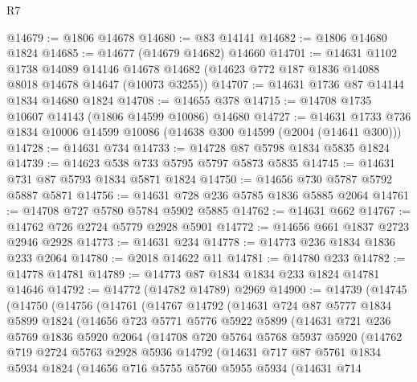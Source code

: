 \begin{lexlean}{R7}
\begin{coremodule}
@14679 := @1806 @14678
@14680 := @83 @14141
@14682 := @1806 @14680 @1824
@14685 := @14677 (@14679 @14682) @14660
@14701 := @14631
    @1102
    @1738
    @14089
    @14146
    @14678
    @14682
    (@14623 @772 @187 @1836 @14088 @8018 @14678 @14647 (@10073 @3255))
@14707 := @14631 @1736 @87 @14144 @1834 @14680 @1824
@14708 := @14655 @378
@14715 := @14708 @1735 @10607 @14143 (@1806 @14599 @10086) @14680
@14727 := @14631 @1733 @736 @1834 @10006 @14599 @10086 (@14638 @300 @14599 (@2004 (@14641 @300)))
@14728 := @14631 @734
@14733 := @14728 @87 @5798 @1834 @5835 @1824
@14739 := @14623 @538 @733 @5795 @5797 @5873 @5835
@14745 := @14631 @731 @87 @5793 @1834 @5871 @1824
@14750 := @14656 @730 @5787 @5792 @5887 @5871
@14756 := @14631 @728 @236 @5785 @1836 @5885 @2064
@14761 := @14708 @727 @5780 @5784 @5902 @5885
@14762 := @14631 @662
@14767 := @14762 @726 @2724 @5779 @2928 @5901
@14772 := @14656 @661 @1837 @2723 @2946 @2928
@14773 := @14631 @234
@14778 := @14773 @236 @1834 @1836 @233 @2064
@14780 := @2018 @14622 @11
@14781 := @14780 @233
@14782 := @14778 @14781
@14789 := @14773 @87 @1834 @1834 @233 @1824 @14781 @14646
@14792 := @14772 (@14782 @14789) @2969
@14900 := @14739
    (@14745
      (@14750
        (@14756
          (@14761
            (@14767
              @14792
              (@14631
                @724
                @87
                @5777
                @1834
                @5899
                @1824
                (@14656
                  @723
                  @5771
                  @5776
                  @5922
                  @5899
                  (@14631
                    @721
                    @236
                    @5769
                    @1836
                    @5920
                    @2064
                    (@14708
                      @720
                      @5764
                      @5768
                      @5937
                      @5920
                      (@14762
                        @719
                        @2724
                        @5763
                        @2928
                        @5936
                        @14792
                        (@14631
                          @717
                          @87
                          @5761
                          @1834
                          @5934
                          @1824
                          (@14656
                            @716
                            @5755
                            @5760
                            @5955
                            @5934
                            (@14631
                              @714

\end{coremodule}
\end{lexlean}
